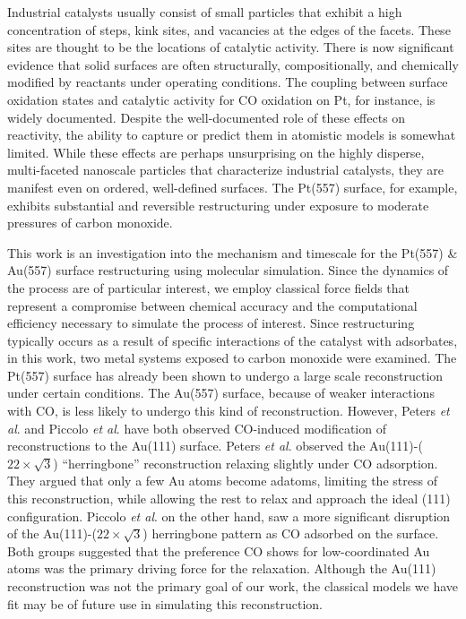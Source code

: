 \documentclass[journal = jpccck, manuscript = article]{achemso}
\begin{document}
Industrial catalysts usually consist of small particles that exhibit a
high concentration of steps, kink sites, and vacancies at the edges of
the facets.  These sites are thought to be the locations of catalytic
activity.\cite{ISI:000083038000001,ISI:000083924800001} There is now
significant evidence that solid surfaces are often structurally,
compositionally, and chemically modified by reactants under operating
conditions.\cite{Tao2008,Tao:2010,Tao2011} The coupling between
surface oxidation states and catalytic activity for CO oxidation on
Pt, for instance, is widely documented.\cite{Ertl08,Hendriksen:2002}
Despite the well-documented role of these effects on reactivity, the
ability to capture or predict them in atomistic models is somewhat
limited.  While these effects are perhaps unsurprising on the highly
disperse, multi-faceted nanoscale particles that characterize
industrial catalysts, they are manifest even on ordered, well-defined
surfaces. The Pt(557) surface, for example, exhibits substantial and
reversible restructuring under exposure to moderate pressures of
carbon monoxide.\cite{Tao:2010}

This work is an investigation into the mechanism and timescale for the
Pt(557) \& Au(557) surface restructuring using molecular simulation.
Since the dynamics of the process are of particular interest, we
employ classical force fields that represent a compromise between
chemical accuracy and the computational efficiency necessary to
simulate the process of interest.  Since restructuring typically
occurs as a result of specific interactions of the catalyst with
adsorbates, in this work, two metal systems exposed to carbon monoxide
were examined. The Pt(557) surface has already been shown to undergo a
large scale reconstruction under certain conditions.\cite{Tao:2010}
The Au(557) surface, because of weaker interactions with CO, is less
likely to undergo this kind of reconstruction. However, Peters {\it et
  al}.\cite{Peters:2000} and Piccolo {\it et al}.\cite{Piccolo:2004}
have both observed CO-induced modification of reconstructions to the
Au(111) surface. Peters {\it et al}. observed the Au(111)-($22 \times
\sqrt{3}$) ``herringbone'' reconstruction relaxing slightly under CO
adsorption. They argued that only a few Au atoms become adatoms,
limiting the stress of this reconstruction, while allowing the rest to
relax and approach the ideal (111) configuration.  Piccolo {\it et
  al}. on the other hand, saw a more significant disruption of the
Au(111)-($22 \times \sqrt{3}$) herringbone pattern as CO adsorbed on
the surface. Both groups suggested that the preference CO shows for
low-coordinated Au atoms was the primary driving force for the
relaxation.  Although the Au(111) reconstruction was not the primary
goal of our work, the classical models we have fit may be of future
use in simulating this reconstruction.
\end{document}
